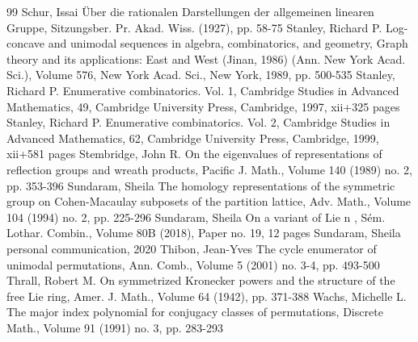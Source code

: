\documentclass[10pt]{article}
\theoremstyle{definition}
\begin{document}
\begin{thebibliography}{99}
Schur, Issai Über die rationalen Darstellungen der allgemeinen linearen Gruppe, Sitzungsber. Pr. Akad. Wiss. (1927), pp. 58-75
Stanley, Richard P. Log-concave and unimodal sequences in algebra, combinatorics, and geometry, Graph theory and its applications: East and West (Jinan, 1986) (Ann. New York Acad. Sci.), Volume 576, New York Acad. Sci., New York, 1989, pp. 500-535
Stanley, Richard P. Enumerative combinatorics. Vol. 1, Cambridge Studies in Advanced Mathematics, 49, Cambridge University Press, Cambridge, 1997, xii+325 pages
Stanley, Richard P. Enumerative combinatorics. Vol. 2, Cambridge Studies in Advanced Mathematics, 62, Cambridge University Press, Cambridge, 1999, xii+581 pages
Stembridge, John R. On the eigenvalues of representations of reflection groups and wreath products, Pacific J. Math., Volume 140 (1989) no. 2, pp. 353-396
Sundaram, Sheila The homology representations of the symmetric group on Cohen-Macaulay subposets of the partition lattice, Adv. Math., Volume 104 (1994) no. 2, pp. 225-296
Sundaram, Sheila On a variant of Lie n , Sém. Lothar. Combin., Volume 80B (2018), Paper no. 19, 12 pages
Sundaram, Sheila personal communication, 2020
Thibon, Jean-Yves The cycle enumerator of unimodal permutations, Ann. Comb., Volume 5 (2001) no. 3-4, pp. 493-500
Thrall, Robert M. On symmetrized Kronecker powers and the structure of the free Lie ring, Amer. J. Math., Volume 64 (1942), pp. 371-388
Wachs, Michelle L. The major index polynomial for conjugacy classes of permutations, Discrete Math., Volume 91 (1991) no. 3, pp. 283-293
\end{thebibliography}
\end{document}
